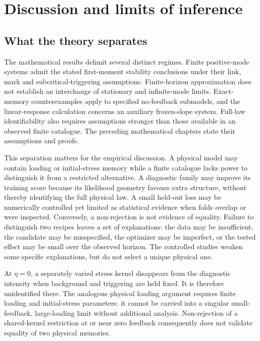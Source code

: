 \chapter{Discussion and limits of inference}
\label{ch:discussion}

\section{What the theory separates}

The mathematical results delimit several distinct regimes. Finite positive-mode systems admit the stated first-moment stability conclusions under their link, mark and subcritical-triggering assumptions. Finite-horizon approximation does not establish an interchange of stationary and infinite-mode limits. Exact-memory counterexamples apply to specified no-feedback submodels, and the linear-response calculation concerns an auxiliary frozen-slope system. Full-law identifiability also requires assumptions stronger than those available in an observed finite catalogue. The preceding mathematical chapters state their assumptions and proofs.

This separation matters for the empirical discussion. A physical model may contain loading or initial-stress memory while a finite catalogue lacks power to distinguish it from a restricted alternative. A diagnostic family may improve its training score because its likelihood geometry favours extra structure, without thereby identifying the full physical law. A small held-out loss may be numerically controlled yet limited as statistical evidence when folds overlap or were inspected. Conversely, a non-rejection is not evidence of equality. Failure to distinguish two recipes leaves a set of explanations: the data may be insufficient, the candidate may be misspecified, the optimizer may be imperfect, or the tested effect may be small over the observed horizon. The controlled studies weaken some specific explanations, but do not select a unique physical one.

At \(\eta=0\), a separately varied stress kernel disappears from the diagnostic intensity when background and triggering are held fixed. It is therefore unidentified there. The analogous physical loading argument requires finite loading and initial-stress parameters: it cannot be carried into a singular small-feedback, large-loading limit without additional analysis. Non-rejection of a shared-kernel restriction at or near zero feedback consequently does not validate equality of two physical memories.

